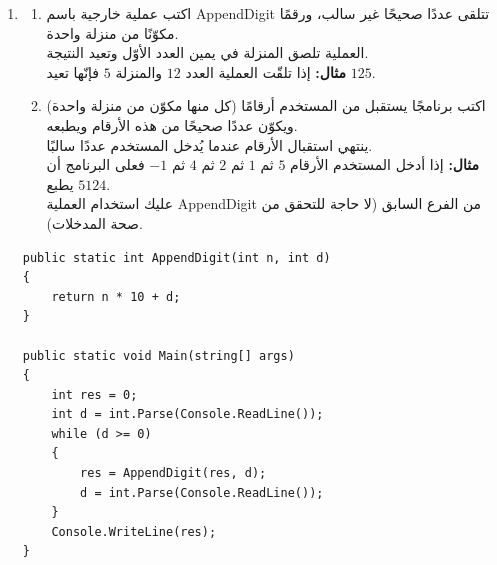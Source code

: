 \documentclass[14pt]{extarticle}
\begin{document}
\begin{enumerate}[itemsep=2em]
\begin{boxSolution}
\begin{english}
\begin{verbatim}
public static void Main(string[] args)
{
    for (int i = 1; i <= 10000; i++)
    {
        if (IsSpecial(i))
        {
            Console.WriteLine(i);
        }
    }
}
\end{verbatim}
\end{english}
\end{boxSolution}
\fi
\filbreak

\item
\begin{enumerate}
    \item اكتب عملية خارجية باسم \textenglish{AppendDigit} تتلقى عددًا صحيحًا غير سالب، ورقمًا مكوّنًا من منزلة واحدة. \\
    العملية تلصق المنزلة في يمين العدد الأوّل وتعيد النتيجة. \\
    \textbf{مثال:} إذا تلقّت العملية العدد $12$ والمنزلة $5$ فإنّها تعيد $125$.
    \item اكتب برنامجًا يستقبل من المستخدم أرقامًا (كل منها مكوّن من منزلة واحدة) ويكوّن عددًا صحيحًا من هذه الأرقام ويطبعه. \\
    ينتهي استقبال الأرقام عندما يُدخل المستخدم عددًا سالبًا. \\
    \textbf{مثال:} إذا أدخل المستخدم الأرقام $5$ ثم $1$ ثم $2$ ثم $4$ ثم $-1$ فعلى البرنامج أن يطبع $5124$. \\
    عليك استخدام العملية \textenglish{AppendDigit} من الفرع السابق (لا حاجة للتحقق من صحة المدخلات).
\end{enumerate}
\ifwithsols
\begin{boxSolution}
\begin{english}
\begin{verbatim}
public static int AppendDigit(int n, int d)
{
    return n * 10 + d;
}

public static void Main(string[] args)
{
    int res = 0;
    int d = int.Parse(Console.ReadLine());
    while (d >= 0)
    {
        res = AppendDigit(res, d);
        d = int.Parse(Console.ReadLine());
    }
    Console.WriteLine(res);
}
\end{verbatim}
\end{english}
\end{boxSolution}
\fi
\filbreak


\end{enumerate}
\end{document}
